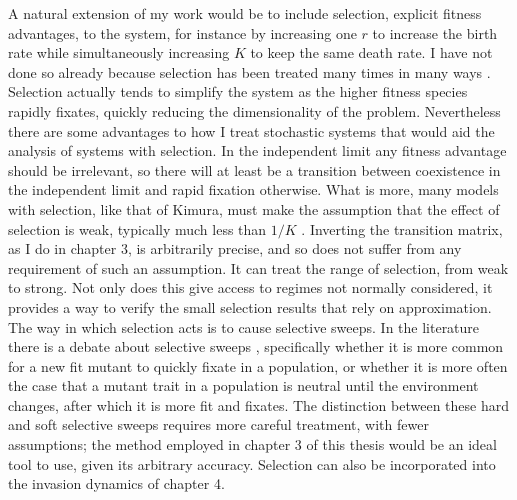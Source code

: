 A natural extension of my work would be to include selection, explicit fitness advantages, to the system, for instance by increasing one $r$ to increase the birth rate while simultaneously increasing $K$ to keep the same death rate. 
I have not done so already because selection has been treated many times in many ways \cite{Chesson2000,Kawecki2004,Orr2005,Lambert2006,Leibold2006,Desai2007,Parsons2007,Patwa2008,Mayfield2010,Lin2012,Constable2016}. 
Selection actually tends to simplify the system as the higher fitness species rapidly fixates, quickly reducing the dimensionality of the problem. 
Nevertheless there are some advantages to how I treat stochastic systems that would aid the analysis of systems with selection. 
In the independent limit any fitness advantage should be irrelevant, so there will at least be a transition between coexistence in the independent limit and rapid fixation otherwise. 
What is more, many models with selection, like that of Kimura, must make the assumption that the effect of selection is weak, typically much less than $1/K$ \cite{Kimura1964,Kimura1969,Kimura1983}. %
Inverting the transition matrix, as I do in chapter 3, is arbitrarily precise, and so does not suffer from any requirement of such an assumption. 
It can treat the range of selection, from weak to strong. 
Not only does this give access to regimes not normally considered, it provides a way to verify the small selection results that rely on approximation. 
The way in which selection acts is to cause selective sweeps. 
In the literature there is a debate about selective sweeps \cite{Jensen2014}, specifically whether it is more common for a new fit mutant to quickly fixate in a population, or whether it is more often the case that a mutant trait in a population is neutral until the environment changes, after which it is more fit and fixates. 
The distinction between these hard and soft selective sweeps requires more careful treatment, with fewer assumptions; the method employed in chapter 3 of this thesis would be an ideal tool to use, given its arbitrary accuracy. 
Selection can also be incorporated into the invasion dynamics of chapter 4. 

